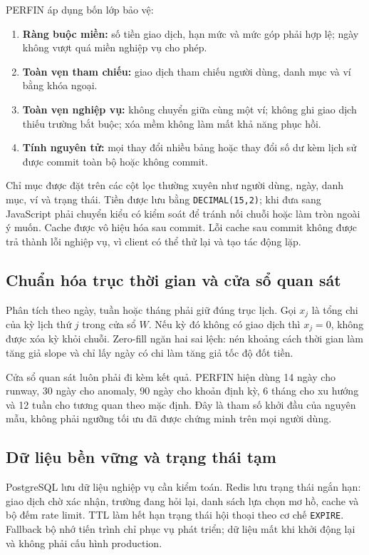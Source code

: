 PERFIN áp dụng bốn lớp bảo vệ:

\begin{enumerate}
  \item \textbf{Ràng buộc miền:} số tiền giao dịch, hạn mức và mức góp
  phải hợp lệ; ngày không vượt quá miền nghiệp vụ cho phép.
  \item \textbf{Toàn vẹn tham chiếu:} giao dịch tham chiếu người dùng,
  danh mục và ví bằng khóa ngoại.
  \item \textbf{Toàn vẹn nghiệp vụ:} không chuyển giữa cùng một ví;
  không ghi giao dịch thiếu trường bắt buộc; xóa mềm không làm mất khả
  năng phục hồi.
  \item \textbf{Tính nguyên tử:} mọi thay đổi nhiều bảng hoặc thay đổi
  số dư kèm lịch sử được commit toàn bộ hoặc không commit.
\end{enumerate}

Chỉ mục được đặt trên các cột lọc thường xuyên như người dùng, ngày,
danh mục, ví và trạng thái. Tiền được lưu bằng
\texttt{DECIMAL(15,2)}; khi đưa sang JavaScript phải chuyển kiểu có kiểm
soát để tránh nối chuỗi hoặc làm tròn ngoài ý muốn. Cache được vô hiệu
hóa sau commit. Lỗi cache sau commit không được trả thành lỗi nghiệp vụ,
vì client có thể thử lại và tạo tác động lặp.

\subsection{Chuẩn hóa trục thời gian và cửa sổ quan sát}

Phân tích theo ngày, tuần hoặc tháng phải giữ đúng trục lịch. Gọi $x_j$
là tổng chi của kỳ lịch thứ $j$ trong cửa sổ $W$. Nếu kỳ đó không có
giao dịch thì $x_j=0$, không được xóa kỳ khỏi chuỗi. Zero-fill ngăn hai
sai lệch: nén khoảng cách thời gian làm tăng giả slope và chỉ lấy ngày
có chi làm tăng giả tốc độ đốt tiền.

Cửa sổ quan sát luôn phải đi kèm kết quả. PERFIN hiện dùng 14 ngày cho
runway, 30 ngày cho anomaly, 90 ngày cho khoản định kỳ, 6 tháng cho xu
hướng và 12 tuần cho tương quan theo mặc định. Đây là tham số khởi đầu
của nguyên mẫu, không phải ngưỡng tối ưu đã được chứng minh trên mọi
người dùng.

\subsection{Dữ liệu bền vững và trạng thái tạm}

PostgreSQL lưu dữ liệu nghiệp vụ cần kiểm toán. Redis lưu trạng thái
ngắn hạn: giao dịch chờ xác nhận, trường đang hỏi lại, danh sách lựa chọn
mơ hồ, cache và bộ đếm rate limit. TTL làm hết hạn trạng thái hội thoại
theo cơ chế \texttt{EXPIRE}. Fallback bộ nhớ tiến trình chỉ phục vụ phát
triển; dữ liệu mất khi khởi động lại và không phải cấu hình production.

